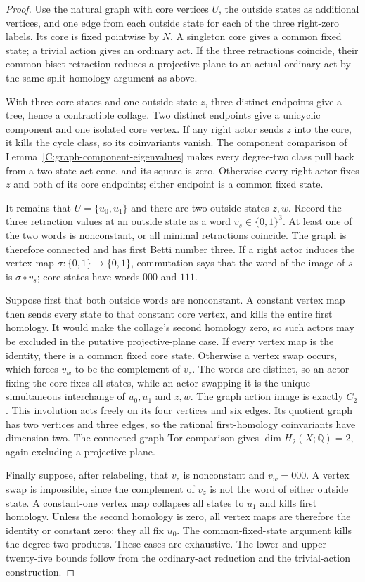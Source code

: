 \begin{proof}
Use the natural graph with core vertices $U$, the outside
states as additional vertices, and one edge from each outside
state for each of the three right-zero labels. Its core is
fixed pointwise by $N$. A singleton core gives a common fixed
state; a trivial action gives an ordinary act. If the three
retractions coincide, their common biset retraction reduces
a projective plane to an actual ordinary act by the same
split-homology argument as above.

With three core states and one outside state $z$, three
distinct endpoints give a tree, hence a contractible collage.
Two distinct endpoints give a unicyclic component and one
isolated core vertex. If any right actor sends $z$ into the
core, it kills the cycle class, so its coinvariants vanish.
The component comparison of
Lemma~\ref{C:graph-component-eigenvalues} makes every degree-two
class pull back from a two-state act cone, and its square is
zero. Otherwise every right actor fixes $z$ and both of its
core endpoints; either endpoint is a common fixed state.

It remains that $U=\{u_0,u_1\}$ and there are two outside
states $z,w$. Record the three retraction values at an outside
state as a word $v_s\in\{0,1\}^3$. At least one of the two
words is nonconstant, or all minimal retractions coincide.
The graph is therefore connected and has first Betti number
three. If a right actor induces the vertex map
$\sigma:\{0,1\}\to\{0,1\}$, commutation says that the word
of the image of $s$ is $\sigma\circ v_s$; core states have
words $000$ and $111$.

Suppose first that both outside words are nonconstant.
A constant vertex map then sends every state to that constant
core vertex, and kills the entire first homology. It would
make the collage's second homology zero, so such actors may
be excluded in the putative projective-plane case.
If every vertex map is the identity, there is a common fixed
core state. Otherwise a vertex swap occurs, which forces
$v_w$ to be the complement of $v_z$. The words are distinct,
so an actor fixing the core fixes all states, while an actor
swapping it is the unique simultaneous interchange of
$u_0,u_1$ and $z,w$. The graph action image is exactly $C_2$.
This involution acts freely on its four vertices and six
edges. Its quotient graph has two vertices and three edges,
so the rational first-homology coinvariants have dimension
two. The connected graph-Tor comparison gives
$\dim H_2(X;\mathbb Q)=2$, again excluding a projective plane.

Finally suppose, after relabeling, that $v_z$ is nonconstant
and $v_w=000$. A vertex swap is impossible, since the
complement of $v_z$ is not the word of either outside state.
A constant-one vertex map collapses all states to $u_1$ and
kills first homology. Unless the second homology is zero,
all vertex maps are therefore the identity or constant zero;
they all fix $u_0$. The common-fixed-state argument kills
the degree-two products. These cases are exhaustive.
The lower and upper twenty-five bounds follow from the
ordinary-act reduction and the trivial-action construction.
\end{proof}

